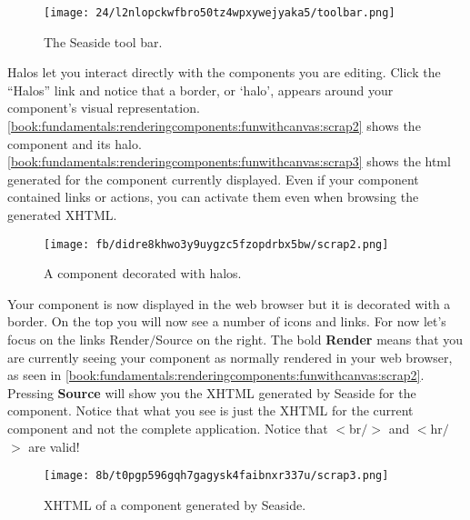 \documentclass[a4paper,10pt,twoside]{book}
\newcommand{\ct}[1]{{\small\ttfamily\textup{#1}}}
\begin{document}
\begin{figure}[h!tbp]
	\begin{center}
		\texttt{[image: 24/l2nlopckwfbro50tz4wpxywejyaka5/toolbar.png]}
		\caption{The Seaside tool bar.\label{book:fundamentals:renderingcomponents:funwithcanvas:toolbar}}
	\end{center}
\end{figure}


Halos let you interact directly with the components you are editing. Click the ``Halos'' link and notice that a border, or `halo', appears around your component's visual representation. \autoref{book:fundamentals:renderingcomponents:funwithcanvas:scrap2} shows the component and its halo. \autoref{book:fundamentals:renderingcomponents:funwithcanvas:scrap3} shows the html generated for the component currently displayed. Even if your component contained links or actions, you can activate them even when browsing the generated XHTML.

\begin{figure}[h!tbp]
	\begin{center}
		\texttt{[image: fb/didre8khwo3y9uygzc5fzopdrbx5bw/scrap2.png]}
		\caption{A component decorated with halos.\label{book:fundamentals:renderingcomponents:funwithcanvas:scrap2}}
	\end{center}
\end{figure}


Your component is now displayed in the web browser but it is decorated with a border. On the top you will now see a number of icons and links. For now let's focus on the links \ct{Render$/$Source} on the right. The bold \textbf{Render} means that you are currently seeing your component as normally rendered in your web browser, as seen in \autoref{book:fundamentals:renderingcomponents:funwithcanvas:scrap2}. Pressing \textbf{Source} will show you the XHTML generated by Seaside for the component. Notice that what you see is just the XHTML for the current component and not the complete application. Notice that \ct{$<$br$/$$>$} and \ct{$<$hr$/$$>$} are valid!

\begin{figure}[h!tbp]
	\begin{center}
		\texttt{[image: 8b/t0pgp596gqh7gagysk4faibnxr337u/scrap3.png]}
		\caption{XHTML of a component generated by Seaside.\label{book:fundamentals:renderingcomponents:funwithcanvas:scrap3}}
	\end{center}
\end{figure}
\end{document}
